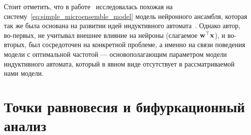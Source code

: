
Стоит отметить, что в работе~\cite{Pchelkin2003} исследовалась похожая на систему~\eqref{eq:simple_microensemble_model} модель нейронного ансамбля, которая так же была основана на развитии идей индуктивного автомата~\cite{EmelyanovYaroslavsky1990}. Однако автор, во-первых, не учитывал внешнее влияние на нейроны (слагаемое $\mathrm{\mathbf{w}}^{\top} \mathrm{\mathbf{x}}$), и во-вторых, был сосредоточен на конкретной проблеме, а именно на связи поведения модели с \socalled оптимальной частотой --- основополагающим параметром модели индуктивного автомата, который в явном виде отсутствует в рассматриваемой нами модели.


\section{Точки равновесия и бифуркационный анализ} \label{section:neuron_equilibrium}


